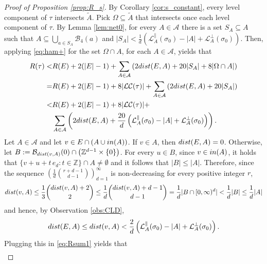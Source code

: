 \documentclass[11pt, reqno]{amsart}
\numberwithin{equation}{section}
\begin{document}
\begin{proof}[Proof of Proposition \ref{prop:R_s}]
By Corollary \ref{cor:s_constant},
every level component of $\tau$ intersects $\tilde{A}$.
Pick $\Omega\subseteq\tilde{A}$ that intersects once each level component of $\tau$. By Lemma \ref{lem:net0}, for every $A\in{\mathcal A}$ there is a set $S_A\subseteq A$ such that 
$A\subseteq\bigcup_{a\in S_A}{\mathcal B}_4(a)$ and
$\lvert S_A\rvert<\frac{1}{d}\left(\mathcal{L}^{\parallel}_A(\sigma_0)-|A|+\mathcal{L}^{\perp}_A(\sigma_0)\right)$.
Then, applying \eqref{eq:ham+} for the set $\Omega\cap A$, for each $A\in{\mathcal A}$, yields that
\begin{align}
R({\tau})<& R(E)+2(\lvert E\rvert-1)+\sum_{A\in{\mathcal A}}\left(2{\rm dist}(E,
A)+20\lvert S_A\rvert+8\lvert\Omega\cap A\rvert\right)\nonumber\\
=& R(E)+2(\lvert E\rvert-1)+8\lvert\mathcal{LC}({\tau})\rvert+\sum_{A\in{\mathcal A}}\left(2{\rm dist}(E,
A)+20\lvert S_A\rvert\right)\nonumber\\
<& R(E)+2(\lvert E\rvert-1)+8\lvert\mathcal{LC}({\tau})\rvert+\nonumber\\
&\sum_{A\in{\mathcal A}}\left(2{\rm dist}(E,
A)+\frac{20}{d}
\left(\mathcal{L}^{\parallel}_A(\sigma_0)-|A|+\mathcal{L}^{\perp}_A(\sigma_0)
\right)\right).\label{eq:Rsum1}
\end{align}
Let $A\in{\mathcal A}$ and let $v\in E\cap(A\cup{\rm in}(A))$.
If $v\in A$, then 
${\rm dist}(E,A)=0$. 
Otherwise, let $B:={\mathcal B}_{{\rm dist}(v,A)}(0)\cap\left({\mathbb Z}^{d-1}\times\{0\}\right)$. For every $u\in B$, since $v\in{\rm in}(A)$, it holds that $\{v+u+t\,e_d\colon t\in{\mathbb Z}\}\cap A\neq\emptyset$ and it follows that $\lvert B\rvert\leq\lvert A\rvert$.
Therefore, since the sequence $\left(\frac{1}{d}\binom{r+d-1}{d-1}\right)_{d=1}^{\infty}$ is non-decreasing for every positive integer $r$, 
\begin{equation*}
{\rm dist}(v,A)\leq\frac{1}{3}\binom{{\rm dist}(v,A)+2}{2}\leq\frac{1}{d}\binom{{\rm dist}(v,A)+d-1}{d-1}=\frac{1}{d}\lvert B\cap[0,\infty)^d\rvert<\frac{1}{d}\lvert B\rvert\leq\frac{1}{ d}\lvert A\rvert
\end{equation*}
and hence, by Observation \ref{obs:CLD},
\begin{equation*}
{\rm dist}(E,A)\leq {\rm dist}(v,A)<
\frac{2}{d}\left(\mathcal{L}^{\parallel}_A(\sigma_0)-|A|+\mathcal{L}^{\perp}_A(\sigma_0)
\right).
\end{equation*}
Plugging this in \eqref{eq:Rsum1} yields that
\begin{align*}

\end{align*}
\end{proof}
\end{document}
